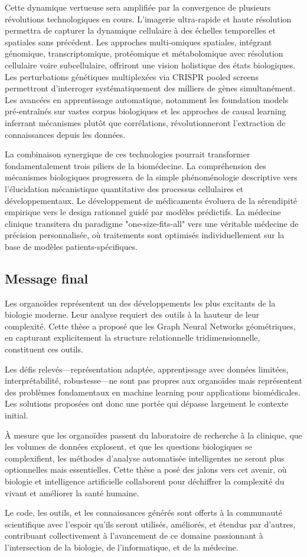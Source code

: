 Cette dynamique vertueuse sera amplifiée par la convergence de plusieurs révolutions technologiques en cours. L'imagerie ultra-rapide et haute résolution permettra de capturer la dynamique cellulaire à des échelles temporelles et spatiales sans précédent. Les approches multi-omiques spatiales, intégrant génomique, transcriptomique, protéomique et métabolomique avec résolution cellulaire voire subcellulaire, offriront une vision holistique des états biologiques. Les perturbations génétiques multiplexées via CRISPR pooled screens permettront d'interroger systématiquement des milliers de gènes simultanément. Les avancées en apprentissage automatique, notamment les foundation models pré-entraînés sur vastes corpus biologiques et les approches de causal learning inferrant mécanismes plutôt que corrélations, révolutionneront l'extraction de connaissances depuis les données.

La combinaison synergique de ces technologies pourrait transformer fondamentalement trois piliers de la biomédecine. La compréhension des mécanismes biologiques progressera de la simple phénoménologie descriptive vers l'élucidation mécanistique quantitative des processus cellulaires et développementaux. Le développement de médicaments évoluera de la sérendipité empirique vers le design rationnel guidé par modèles prédictifs. La médecine clinique transitera du paradigme "one-size-fits-all" vers une véritable médecine de précision personnalisée, où traitements sont optimisés individuellement sur la base de modèles patients-spécifiques.

\subsection{Message final}

Les organoïdes représentent un des développements les plus excitants de la biologie moderne. Leur analyse requiert des outils à la hauteur de leur complexité. Cette thèse a proposé que les Graph Neural Networks géométriques, en capturant explicitement la structure relationnelle tridimensionnelle, constituent ces outils.

Les défis relevés—représentation adaptée, apprentissage avec données limitées, interprétabilité, robustesse—ne sont pas propres aux organoïdes mais représentent des problèmes fondamentaux en machine learning pour applications biomédicales. Les solutions proposées ont donc une portée qui dépasse largement le contexte initial.

À mesure que les organoïdes passent du laboratoire de recherche à la clinique, que les volumes de données explosent, et que les questions biologiques se complexifient, les méthodes d'analyse automatisée intelligentes ne seront plus optionnelles mais essentielles. Cette thèse a posé des jalons vers cet avenir, où biologie et intelligence artificielle collaborent pour déchiffrer la complexité du vivant et améliorer la santé humaine.

Le code, les outils, et les connaissances générés sont offerts à la communauté scientifique avec l'espoir qu'ils seront utilisés, améliorés, et étendus par d'autres, contribuant collectivement à l'avancement de ce domaine passionnant à l'intersection de la biologie, de l'informatique, et de la médecine.
